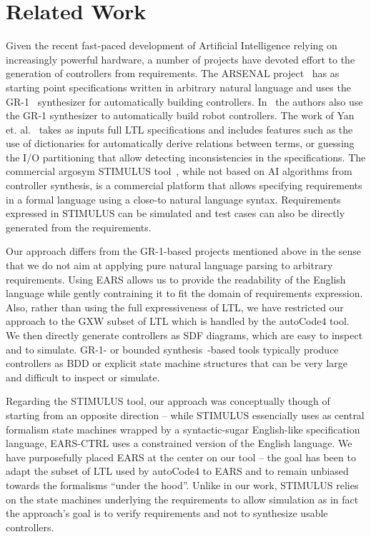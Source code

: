 \section{Related Work}
\vspace{-.2cm}Given the recent fast-paced development of Artificial Intelligence
relying on increasingly powerful hardware, a number of projects have devoted
effort to the generation of controllers from requirements. The ARSENAL
project~\cite{ghosh2016arsenal} has as starting point specifications written in
arbitrary natural language and uses the GR-1~\cite{piterman2006synthesis}
synthesizer for automatically building controllers. In~\cite{YanCC15} the
authors also use the GR-1 synthesizer to automatically build robot
controllers. The work of Yan et. al.~\cite{YanCC15} takes as inputs full LTL
specifications and includes features such as the use of dictionaries for
automatically derive relations between terms, or guessing the I/O partitioning
that allow detecting inconsistencies in the specifications. The commercial
argosym STIMULUS tool~\cite{jeannet16}, while not based on AI algorithms from controller
synthesis, is a commercial platform that allows specifying requirements in a
formal language using a close-to natural language syntax. Requirements expressed
in STIMULUS can be simulated and test cases can also be directly generated from
the requirements.

Our approach differs from the GR-1-based projects mentioned above in the sense
that we do not aim at applying pure natural language parsing to arbitrary
requirements. Using EARS allows us to provide the readability of the English
language while gently contraining it to fit the domain of requirements
expression. Also, rather than using the full expressiveness of LTL, we have
restricted our approach to the \textsf{GXW} subset of LTL which is handled by
the \textsf{autoCode4} tool. We then directly generate controllers as SDF
diagrams, which are easy to inspect and to simulate. GR-1- or bounded
synthesis~\cite{schewe2007bounded}-based tools typically produce controllers as
BDD or explicit state machine structures that can be very large and difficult to inspect or simulate.

Regarding the STIMULUS tool, our approach was conceptually though of starting
from an opposite direction -- while STIMULUS essencially uses as central
formalism state machines wrapped by a syntactic-sugar English-like specification
language, \textsf{EARS-CTRL} uses a constrained version of the English language.
We have purposefully placed EARS at the center on our tool -- the goal has been
to adapt the subset of LTL used by \textsf{autoCode4} to EARS and to remain
unbiased towards the formalisms ``under the hood''. Unlike in our work, STIMULUS
relies on the state machines underlying the requirements to allow simulation as
in fact the approach's goal is to verify requirements and not to synthesize
usable controllers.\vspace{-.6cm}

